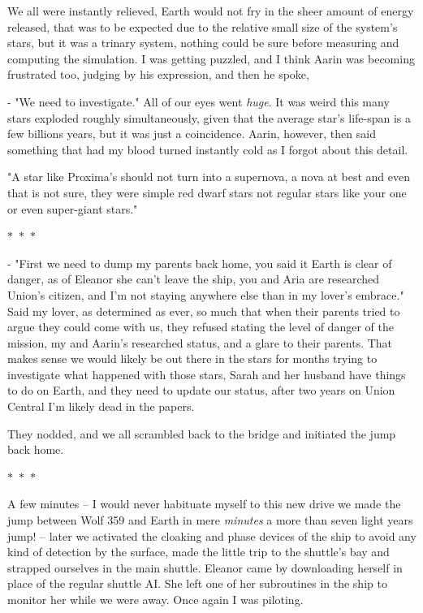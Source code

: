 \documentclass[colorlinks,12pt,a4paper]{book}
\newcommand\sep{\begin{center}
  \boldmath $\ast$~$\ast$~$\ast$
\end{center}}
\begin{document}
 We all were instantly relieved, Earth would not fry in the sheer amount of energy released, that was to be expected due to the 
 relative small size of the system's stars, but it was a trinary system, nothing could be sure before measuring and computing 
 the simulation. I was getting puzzled, and I think Aarin was becoming frustrated too, judging by his expression, and then he spoke, \par 
 \bigskip
 
 - "We need to investigate." All of our eyes went \textit{huge}. It was weird this many stars exploded roughly simultaneously,
 given that the average star's life-span is a few billions years, but it was just a coincidence. Aarin, however, then said something that had my 
 blood turned instantly cold as I forgot about this detail.\par 
 "A star like Proxima's should not turn into a supernova, a nova at best and even that is not sure, they were simple red dwarf stars 
 not regular stars like your one or even super-giant stars."
 
 \sep
 
 - "First we need to dump my parents back home, you said it Earth is clear of danger, as of Eleanor she can't leave the ship,
 you and Aria are researched Union's citizen, and I'm not staying anywhere else than in my lover's embrace." Said my lover, 
 as determined as ever, so much that when their parents tried to argue they could come with us, they refused stating the level of danger
 of the mission, my and Aarin's researched status, and a glare to their parents. That makes sense we would likely be out there in the 
 stars for months trying to investigate what happened with those stars, Sarah and her husband have things to do on Earth, and they need to 
 update our status, after two years on Union Central I'm likely dead in the papers.\par
 \bigskip
 
 They nodded, and we all scrambled back to the bridge and initiated the jump back home.
 
 \sep 
 
 A few minutes -- I would never habituate myself to this new drive we made the jump between Wolf 359 and Earth in mere \textit{minutes}
 a more than seven light years jump! -- later we activated the cloaking and phase devices of the ship to avoid any kind of 
 detection by the surface, made the little trip to the shuttle's bay and strapped ourselves in the main shuttle. Eleanor came by downloading 
 herself in place of the regular shuttle AI. She left one of her subroutines in the ship to monitor her while we were away. Once 
 again I was piloting.\par 
 \bigskip 
 
\end{document}
